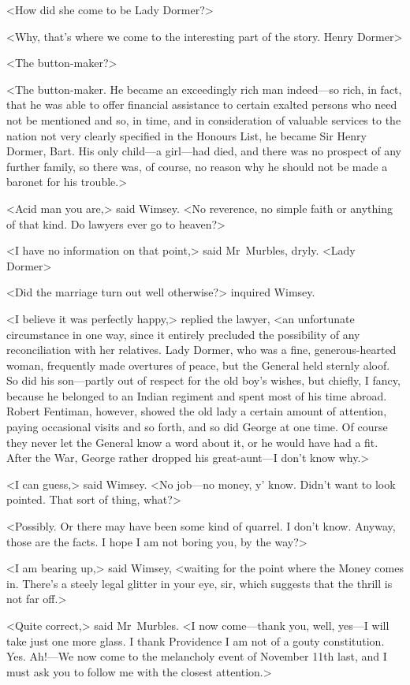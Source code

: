<How did she come to be Lady Dormer?>

<Why, that's where we come to the interesting part of the story. Henry Dormer\longdash>

<The button-maker?>

<The button-maker. He became an exceedingly rich man indeed—so rich, in fact, that he was able to offer financial assistance to certain exalted persons who need not be mentioned and so, in time, and in consideration of valuable services to the nation not very clearly specified in the Honours List, he became Sir Henry Dormer, Bart. His only child—a girl—had died, and there was no prospect of any further family, so there was, of course, no reason why he should not be made a baronet for his trouble.>

<Acid man you are,> said Wimsey. <No reverence, no simple faith or anything of that kind. Do lawyers ever go to heaven?>

<I have no information on that point,> said Mr~Murbles, dryly. <Lady Dormer\longdash>

<Did the marriage turn out well otherwise?> inquired Wimsey.

<I believe it was perfectly happy,> replied the lawyer, <an unfortunate circumstance in one way, since it entirely precluded the possibility of any reconciliation with her relatives. Lady Dormer, who was a fine, generous-hearted woman, frequently made overtures of peace, but the General held sternly aloof. So did his son—partly out of respect for the old boy's wishes, but chiefly, I fancy, because he belonged to an Indian regiment and spent most of his time abroad. Robert Fentiman, however, showed the old lady a certain amount of attention, paying occasional visits and so forth, and so did George at one time. Of course they never let the General know a word about it, or he would have had a fit. After the War, George rather dropped his great-aunt—I don't know why.>

<I can guess,> said Wimsey. <No job—no money, y' know. Didn't want to look pointed. That sort of thing, what?>

<Possibly. Or there may have been some kind of quarrel. I don't know. Anyway, those are the facts. I hope I am not boring you, by the way?>

<I am bearing up,> said Wimsey, <waiting for the point where the Money comes in. There's a steely legal glitter in your eye, sir, which suggests that the thrill is not far off.>

<Quite correct,> said Mr~Murbles. <I now come—thank you, well, yes—I will take just one more glass. I thank Providence I am not of a gouty constitution. Yes. Ah!—We now come to the melancholy event of November 11th last, and I must ask you to follow me with the closest attention.>


